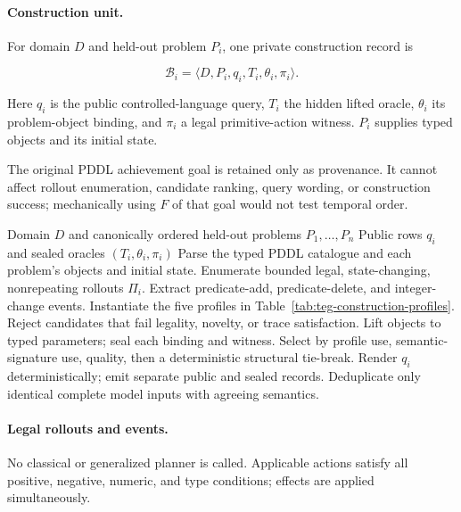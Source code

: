 \paragraph{Construction unit.}
For domain $D$ and held-out problem $P_i$, one private construction record is

\[
\mathcal B_i=\langle D,P_i,q_i,T_i,\theta_i,\pi_i\rangle .
\]

Here $q_i$ is the public controlled-language query, $T_i$ the hidden lifted
\ltlf{} oracle, $\theta_i$ its problem-object binding, and $\pi_i$ a legal
primitive-action witness. $P_i$ supplies typed objects and its initial state.

The original PDDL achievement goal is retained only as provenance. It cannot
affect rollout enumeration, candidate ranking, query wording, or construction
success; mechanically using $F$ of that goal would not test temporal order.

\begin{algorithm}[htbp]
\caption{Witness-backed construction of the TEG benchmark}
\label{alg:teg-benchmark-construction}
\begin{algorithmic}[1]
\REQUIRE Domain $D$ and canonically ordered held-out problems $P_1,\ldots,P_n$
\ENSURE Public rows $q_i$ and sealed oracles $(T_i,\theta_i,\pi_i)$
\STATE Parse the typed PDDL catalogue and each problem's objects and initial state.
\STATE Enumerate bounded legal, state-changing, nonrepeating rollouts $\Pi_i$.
\STATE Extract predicate-add, predicate-delete, and integer-change events.
\STATE Instantiate the five profiles in Table~\ref{tab:teg-construction-profiles}.
\STATE Reject candidates that fail legality, novelty, or trace satisfaction.
\STATE Lift objects to typed parameters; seal each binding and witness.
\STATE Select by profile use, semantic-signature use, quality, then a deterministic structural tie-break.
\STATE Render $q_i$ deterministically; emit separate public and sealed records.
\ENDFOR
\STATE Deduplicate only identical complete model inputs with agreeing semantics.
\end{algorithmic}
\end{algorithm}

\paragraph{Legal rollouts and events.}
No classical or generalized planner is called. Applicable actions satisfy all
positive, negative, numeric, and type conditions; effects are applied
simultaneously.


